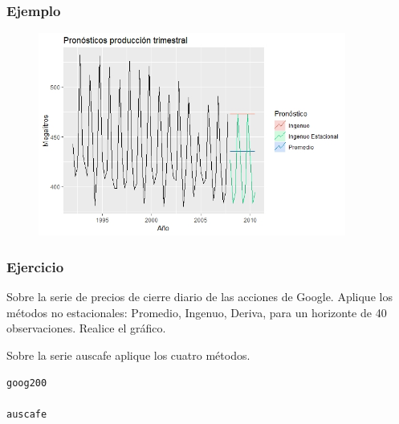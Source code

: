 \documentclass[10pt]{beamer}
\begin{document}


\begin{frame}[fragile]
\frametitle{Ejemplo}


\begin{figure}
\begin{center}
    \includegraphics[width=0.9\textwidth]{Imagen1.JPEG}
\end{center}
\end{figure}

\end{frame}




\begin{frame}[fragile]
\frametitle{Ejercicio}


Sobre la serie de precios de cierre diario de las acciones de Google. Aplique los métodos no estacionales: Promedio, Ingenuo, Deriva, para un horizonte de 40 observaciones. Realice el gráfico.

\vspace{4mm}
Sobre la serie auscafe aplique los cuatro métodos.

\vspace{6mm}

\lstset{language=r,label= ,caption= ,captionpos=b,numbers=none}
\begin{lstlisting}
goog200

auscafe
\end{lstlisting}



\end{frame}


\end{document}
